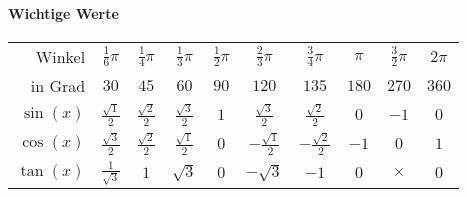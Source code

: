 \documentclass[a4paper, 9pt, DIV=24]{scrartcl}
\begin{document}
\paragraph{Wichtige Werte}
\begin{center}
\begin{tabular}[m]{r|ccccccccc}
Winkel & $\frac{1}{6}\pi$ & $\frac{1}{4}\pi$ & $\frac{1}{3}\pi$ & $\frac{1}{2}\pi$ & $\frac{2}{3}\pi$ & $\frac{3}{4}\pi$ & $\pi$ & $\frac{3}{2}\pi$ & $2\pi$ \\[.1em]
in Grad & $30$ & $45$ & $60$ & $90$ & $120$ & $135$ & $180$ & $270$ & $360$ \\\hline
$\sin(x)$ & $\frac{\sqrt{1}}{2}$ & $\frac{\sqrt{2}}{2}$ & $\frac{\sqrt{3}}{2}$ & $1$ & $\frac{\sqrt{3}}{2}$ & $\frac{\sqrt{2}}{2}$ & $0$ & $-1$ & $0$ \\[.1em]
$\cos(x)$ & $\frac{\sqrt{3}}{2}$ & $\frac{\sqrt{2}}{2}$ & $\frac{\sqrt{1}}{2}$ & $0$ & $-\frac{\sqrt{1}}{2}$ & $-\frac{\sqrt{2}}{2}$ & $-1$ & $0$ & $1$ \\[.1em]
$\tan(x)$ & $\frac{1}{\sqrt{3}}$ & $1$ & $\sqrt{3}$ & $0$ & $-\sqrt{3}$ & $-1$ & $0$ & $\times$ & $0$ \\
\end{tabular}
\end{center}
\end{document}
